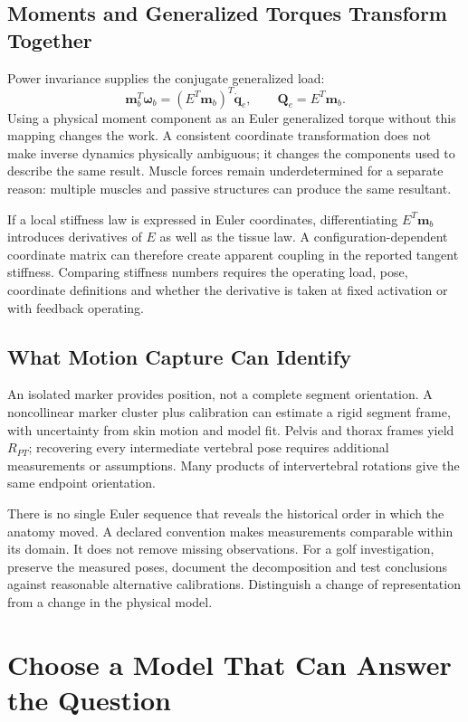 \subsection{Moments and Generalized Torques Transform Together}
Power invariance supplies the conjugate generalized load:
\begin{equation}
\bm m_b^T\bm\omega_b=(E^T\bm m_b)^T\dot{\bm q}_e,
\qquad \bm Q_e=E^T\bm m_b.
\end{equation}
Using a physical moment component as an Euler generalized torque without this mapping changes the work. A consistent coordinate transformation does not make inverse dynamics physically ambiguous; it changes the components used to describe the same result. Muscle forces remain underdetermined for a separate reason: multiple muscles and passive structures can produce the same resultant.

If a local stiffness law is expressed in Euler coordinates, differentiating $E^T\bm m_b$ introduces derivatives of $E$ as well as the tissue law. A configuration-dependent coordinate matrix can therefore create apparent coupling in the reported tangent stiffness. Comparing stiffness numbers requires the operating load, pose, coordinate definitions and whether the derivative is taken at fixed activation or with feedback operating.

\subsection{What Motion Capture Can Identify}
An isolated marker provides position, not a complete segment orientation. A noncollinear marker cluster plus calibration can estimate a rigid segment frame, with uncertainty from skin motion and model fit. Pelvis and thorax frames yield $R_{PT}$; recovering every intermediate vertebral pose requires additional measurements or assumptions. Many products of intervertebral rotations give the same endpoint orientation.

There is no single Euler sequence that reveals the historical order in which the anatomy moved. A declared convention makes measurements comparable within its domain. It does not remove missing observations. For a golf investigation, preserve the measured poses, document the decomposition and test conclusions against reasonable alternative calibrations. Distinguish a change of representation from a change in the physical model.

\section{Choose a Model That Can Answer the Question}
\label{sec:modeling_approaches}

